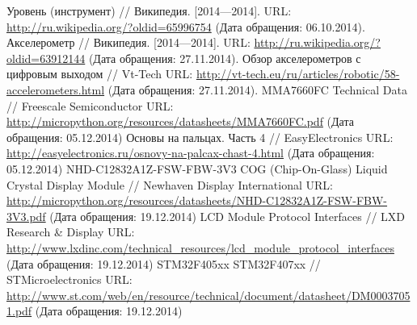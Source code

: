 \documentclass[document.tex]{subfiles}
\begin{document}
\clearpage
{}
\begin{thebibliography}{@@@@}	
		Уровень (инструмент) // Википедия. [2014—2014].
		URL: {\url{http://ru.wikipedia.org/?oldid=65996754}} 
		(Дата обращения: 06.10.2014).
		Акселерометр // Википедия. [2014—2014]. 
		URL: {\url{http://ru.wikipedia.org/?oldid=63912144}}
		(Дата обращения: 27.11.2014).
		Обзор акселерометров с цифровым выходом // Vt-Tech
		URL: {\url{http://vt-tech.eu/ru/articles/robotic/58-accelerometers.html}}
		(Дата обращения: 27.11.2014).
		MMA7660FC Technical Data // Freescale Semiconductor
		URL: {\url{http://micropython.org/resources/datasheets/MMA7660FC.pdf}}
		(Дата обращения: 05.12.2014)
		Основы на пальцах. Часть 4 // EasyElectronics
		URL: {\url{http://easyelectronics.ru/osnovy-na-palcax-chast-4.html}}
		(Дата обращения: 05.12.2014)
		NHD-C12832A1Z-FSW-FBW-3V3 COG (Chip-On-Glass) Liquid Crystal Display Module // Newhaven Display International
		URL: {\url{http://micropython.org/resources/datasheets/NHD-C12832A1Z-FSW-FBW-3V3.pdf}}
		(Дата обращения: 19.12.2014)
		LCD Module Protocol Interfaces // LXD Research & Display
		URL: {\url{http://www.lxdinc.com/technical_resources/lcd_module_protocol_interfaces}}
		(Дата обращения: 19.12.2014)
		STM32F405xx STM32F407xx // STMicroelectronics
		URL: {\url{http://www.st.com/web/en/resource/technical/document/datasheet/DM00037051.pdf}}
		(Дата обращения: 19.12.2014)
	\end{thebibliography}
\end{document}
